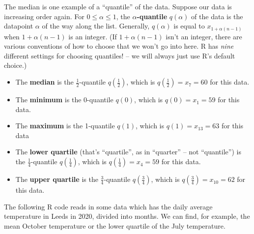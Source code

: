 \documentclass[
  a4paper,
]{book}
\newenvironment{Shaded}{\begin{snugshade}}{\end{snugshade}}
\newcommand{\FunctionTok}[1]{\textcolor[rgb]{0.00,0.00,0.00}{#1}}
\newcommand{\NormalTok}[1]{#1}
\newcommand{\OtherTok}[1]{\textcolor[rgb]{0.56,0.35,0.01}{#1}}
\newcommand{\SpecialCharTok}[1]{\textcolor[rgb]{0.00,0.00,0.00}{#1}}
\newcommand{\StringTok}[1]{\textcolor[rgb]{0.31,0.60,0.02}{#1}}
\providecommand{\tightlist}{%
  \setlength{\itemsep}{0pt}\setlength{\parskip}{0pt}}
\theoremstyle{definition}
\theoremstyle{definition}
\theoremstyle{definition}
\theoremstyle{definition}
\theoremstyle{remark}
\begin{document}
The median is one example of a ``quantile'' of the data. Suppose our data is increasing order again. For \(0 \leq \alpha \leq 1\), the \textbf{\(\alpha\)-quantile} \(q(\alpha)\) of the data is the datapoint \(\alpha\) of the way along the list. Generally, \(q(\alpha)\) is equal to \(x_{1+\alpha(n-1)}\) when \(1+\alpha(n-1)\) is an integer. (If \(1+\alpha(n-1)\) isn't an integer, there are various conventions of how to choose that we won't go into here. R has \emph{nine} different settings for choosing quantiles! -- we will always just use R's default choice.)

\begin{itemize}
\tightlist
\item
  The \textbf{median} is the \(\frac12\)-quantile \(q(\frac12)\), which is \(q(\frac12) = x_7 = 60\) for this data.
\item
  The \textbf{minimum} is the 0-quantile \(q(0)\), which is \(q(0) = x_1 = 59\) for this data.
\item
  The \textbf{maximum} is the 1-quantile \(q(1)\), which is \(q(1) = x_{13} = 63\) for this data
\item
  The \textbf{lower quartile} (that's ``quartile'', as in ``quarter'' -- not ``quantile'') is the \(\frac14\)-quantile \(q(\frac14)\), which is \(q(\frac14) = x_4 = 59\) for this data.
\item
  The \textbf{upper quartile} is the \(\frac34\)-quantile \(q(\frac34)\), which is \(q(\frac34) = x_{10} = 62\) for this data.
\end{itemize}

The following R code reads in some data which has the daily average temperature in Leeds in 2020, divided into months. We can find, for example, the mean October temperature or the lower quartile of the July temperature.

\begin{Shaded}
\end{Shaded}
\end{document}
